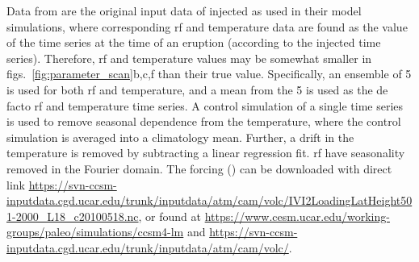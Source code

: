 \documentclass{ametsocV6.1}
\newcommand{\iso}[1][i]{{#1}njected \ce{SO2}}
\begin{document}





%



\appendix


Data from \citet{ottobliesner2016} are the original input data of \iso{} as used in
their model simulations, where corresponding \gls{rf} and temperature data are found as
the value of the time series at the time of an eruption (according to the \iso{} time
series). Therefore, \gls{rf} and temperature values may be somewhat smaller in
figs.~\ref{fig:parameter_scan}b,c,f than their true value. Specifically, an ensemble of
5 is used for both \gls{rf} and temperature, and a mean from the 5 is used as the de
facto \gls{rf} and temperature time series. A control simulation of a single time series
is used to remove seasonal dependence from the temperature, where the control simulation
is averaged into a climatology mean. Further, a drift in the temperature is removed by
subtracting a linear regression fit. \gls{rf} have seasonality removed in the Fourier
domain. The forcing () can be downloaded with direct link
\url{https://svn-ccsm-inputdata.cgd.ucar.edu/trunk/inputdata/atm/cam/volc/IVI2LoadingLatHeight501-2000_L18_c20100518.nc},
or found at \url{https://www.cesm.ucar.edu/working-groups/paleo/simulations/ccsm4-lm}
and \url{https://svn-ccsm-inputdata.cgd.ucar.edu/trunk/inputdata/atm/cam/volc/}.

% 
% 

  \clearpage
\printglossary[type=\acronymtype,title=List of Acronyms]
\end{document}

